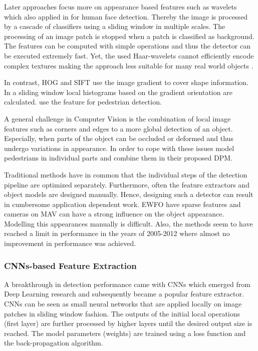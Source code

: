 Later approaches focus more on appearance based features such as wavelets \cite{Papageorgiou} which also applied in \cite{Viola2004} for human face detection. Thereby the image is processed by a cascade of classifiers using a sliding window in multiple scales. The processing of an image patch is stopped when a patch is classified as background. The features can be computed with simple operations and thus the detector can be executed extremely fast. Yet, the used Haar-wavelets cannot efficiently encode complex textures making the approach less suitable for many real world objects \cite{Andreopoulos2013}. 

In contrast, \ac{HOG} \cite{Dalal} and \ac{SIFT} \cite{Lowe2004} use the image gradient to cover shape information. In a sliding window local histograms based on the gradient orientation are calculated. \citeauthor{Dalal} \cite{Dalal} use the feature for pedestrian detection.

A general challenge in Computer Vision is the combination of local image features such as corners and edges to a more global detection of an object. Especially, when parts of the object can be occluded or deformed and thus undergo variations in appearance. In order to cope with these issues \citeauthor{Felzenszwalb} \cite{Felzenszwalb} model pedestrians in individual parts and combine them in their proposed \ac{DPM}.

Traditional methods have in common that the individual steps of the detection pipeline are optimized separately. Furthermore, often the feature extractors and object models are designed manually. Hence, designing such a detector can result in cumbersome application dependent work. \ac{EWFO} have sparse features and cameras on \ac{MAV} can have a strong influence on the object appearance. Modelling this appearances manually is difficult. Also, the methods seem to have reached a limit in performance in the years of 2005-2012 where almost no improvement in performance was achieved.

\subsubsection{\acp{CNN}-based Feature Extraction}

A breakthrough in detection performance came with \acp{CNN} which emerged from Deep Learning research and subsequently became a popular feature extractor. \acp{CNN} can be seen as small neural networks that are applied locally on image patches in sliding window fashion. The outputs of the initial local operations (first layer) are further processed by higher layers until the desired output size is reached. The model parameters (weights) are trained using a loss function and the back-propagation algorithm.

